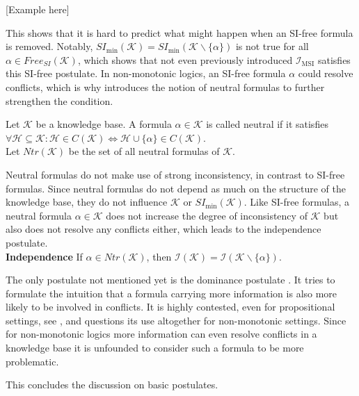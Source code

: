     [Example here]

This shows that it is hard to predict what might happen when an SI-free formula is removed. Notably, \(SI_{\min}(\mathcal{K}) = SI_{\min}(\mathcal{K} \backslash \{\alpha\})\) is not true for all \(\alpha \in Free_{SI}(\mathcal{K})\), which shows that not even previously introduced \(\mathcal{I}_{\text{MSI}}\) satisfies this SI-free postulate. In non-monotonic logics, an SI-free formula \(\alpha\) could resolve conflicts, which is why \cite{brewka_strong_2017} introduces the notion of neutral formulas to further strengthen the condition.

\begin{definition}
    Let \(\mathcal{K}\) be a knowledge base. A formula \(\alpha \in \mathcal{K}\) is called neutral if it satisfies\\
    \(\forall \mathcal{H} \subseteq \mathcal{K}: \mathcal{H} \in C(\mathcal{K}) \Leftrightarrow \mathcal{H} \cup \{\alpha\} \in C(\mathcal{K})\).\\
    Let \(Ntr(\mathcal{K})\) be the set of all neutral formulas of \(\mathcal{K}\).
\end{definition}

Neutral formulas do not make use of strong inconsistency, in contrast to SI-free formulas. Since neutral formulas do not depend as much on the structure of the knowledge base, they do not influence \(\mathcal{K}\) or \(SI_{\min}(\mathcal{K})\). Like SI-free formulas, a neutral formula \(\alpha \in \mathcal{K}\) does not increase the degree of inconsistency of \(\mathcal{K}\) but also does not resolve any conflicts either, which leads to the independence postulate.
\\
\textbf{Independence}
If \(\alpha \in Ntr(\mathcal{K})\), then \(\mathcal{I}(\mathcal{K}) = \mathcal{I}(\mathcal{K} \backslash \{\alpha\})\).

The only postulate not mentioned yet is the dominance postulate \cite{hunter_measure_2010}. It tries to formulate the intuition that a formula carrying more information is also more likely to be involved in conflicts. It is highly contested, even for propositional settings, see \cite{ferme_revisiting_2014}, and \cite{ulbricht_measuring_2018} questions its use altogether for non-monotonic settings. Since for non-monotonic logics more information can even resolve conflicts in a knowledge base it is unfounded to consider such a formula to be more problematic.

This concludes the discussion on basic postulates.

